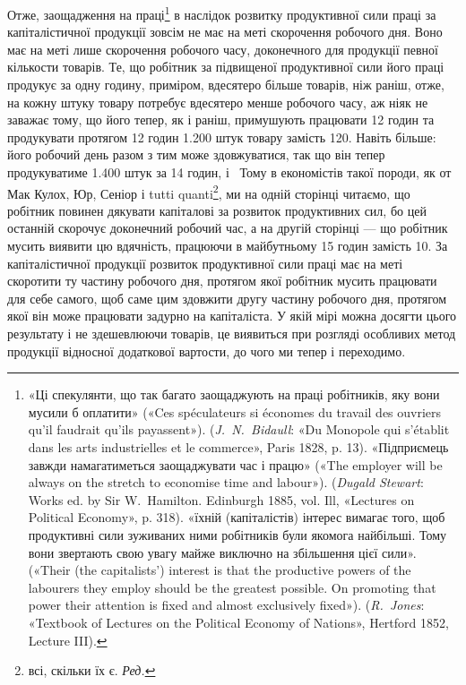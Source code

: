 Отже, заощадження на праці\footnote{
«Ці спекулянти, що так багато заощаджують на праці робітників,
яку вони мусили б оплатити» («Ces spéculateurs si économes du travail
des ouvriers qu’il faudrait qu’ils payassent»). (\emph{J.~N.~Bidaull}: «Du
Monopole qui s’établit dans les arts industrielles et le commerce», Paris
1828, p. 13). «Підприємець завжди намагатиметься заощаджувати час і
працю» («The employer will be always on the stretch to economise
time and labour»). (\emph{Dugald Stewart}: Works ed. by Sir W.~Hamilton.
Edinburgh 1885, vol. Ill, «Lectures on Political Economy», p. 318). «їхній
(капіталістів) інтерес вимагає того, щоб продуктивні сили зуживаних
ними робітників були якомога найбільші. Тому вони звертають свою
увагу майже виключно на збільшення цієї сили». («Their (the capitalists’)
interest is that the productive powers of the labourers they employ should
be the greatest possible. On promoting that power their attention is fixed
and almost exclusively fixed»). (\emph{R.~Jones}: «Textbook of Lectures on
the Political Economy of Nations», Hertford 1852, Lecture III).
} в наслідок розвитку продуктивної сили праці за капіталістичної продукції
зовсім не має на меті скорочення робочого дня. Воно має на меті лише скорочення
робочого часу, доконечного для продукції певної кількости товарів.
Те, що робітник за підвищеної продуктивної сили його праці
продукує за одну годину, приміром, вдесятеро більше товарів,
ніж раніш, отже, на кожну штуку товару потребує вдесятеро
менше робочого часу, аж ніяк не заважає тому, що його тепер,
як і раніш, примушують працювати 12 годин та продукувати
протягом 12 годин \num{1.200} штук товару замість 120. Навіть більше:
його робочий день разом з тим може здовжуватися, так що він
тепер продукуватиме \num{1.400} штук за 14 годин, і~ Тому в економістів
такої породи, як от Мак Кулох, Юр, Сеніор і tutti
quanti\footnote*{
всі, скільки їх є. \emph{Ред.}
}, ми на одній сторінці читаємо, що робітник повинен дякувати капіталові за
розвиток продуктивних сил, бо цей останній
скорочує доконечний робочий час, а на другій сторінці — що
робітник мусить виявити цю вдячність, працюючи в майбутньому
15 годин замість 10. За капіталістичної продукції розвиток продуктивної сили
праці має на меті скоротити ту частину робочого
дня, протягом якої робітник мусить працювати для себе самого,
щоб саме цим здовжити другу частину робочого дня, протягом
якої він може працювати задурно на капіталіста. У якій мірі
можна досягти цього результату і не здешевлюючи товарів, це
виявиться при розгляді особливих метод продукції відносної
додаткової вартости, до чого ми тепер і переходимо.
